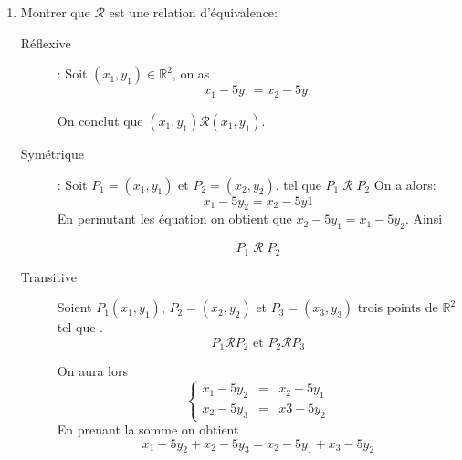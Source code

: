 \documentclass[12pt,a4paper,dvipsnames]{article}
\begin{document}
    \begin{enumerate}
        \item Montrer que $\mathcal{R}$ est une relation d'équivalence:

            \begin{description}
                \item[Réflexive]: Soit $(x_1, y_1)\in \mathbb{R}^2$,  on as $$
                    x_1 - 5y_1 = x_2 - 5y_1$$

                    On conclut que
                    $(x_1,y_1) \mathcal{R} (x_1, y_1)$.\\[4pt]

                \item [Symétrique]: Soit $P_1=(x_1, y_1)$ et $P_2=(x_2, y_2)$.
                    tel que $ P_1\;\mathcal{R}\; P_2$
                    On a alors:
                    \begin{equation}
                        x_1 - 5y_2 = x_2 - 5y1
                    \end{equation}
                    En permutant les équation on obtient que $x_2 - 5y_1 = x_1 -
                    5y_2$. Ainsi 

                    \begin{equation}
                        P_1 \; \mathcal{R} \; P_2
                    \end{equation}

                \item [Transitive] Soient $P_1(x_1,y_1)$, $P_2=(x_2, y_2)$ et
                    $P_3=(x_3,
                    y_3)$ trois points de $\mathbb{R}^2$ tel que .
                    $$
                    P_1 \mathcal{R} P_2 \text{ et } P_2 \mathcal{R} P_3
                    $$

                    On aura lors 
                    \begin{equation}
                        \left\{\begin{array}{lll} x_1 - 5y_2 &=& x_2 - 5y_1\\
                        x_2 - 5y_3 &=& x3 - 5y_2 \end{array}\right.
                    \end{equation}
                    En prenant la somme on obtient
                    \begin{equation}
                        x_1 -5y_2 + x_2 -5y_3 = x_2 -5y_1 + x_3 -5y_2
                    \end{equation}


\end{description}
\end{enumerate}
\end{document}
